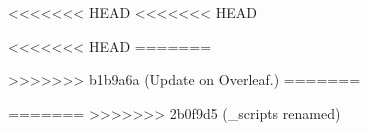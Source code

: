 

% 
% 
\setcounter{chapter}{1}
<<<<<<< HEAD
<<<<<<< HEAD

<<<<<<< HEAD
% 
% 
=======


>>>>>>> b1b9a6a (Update on Overleaf.)
=======

% 
% 
=======
% 
% 
% 
>>>>>>> 2b0f9d5 (_scripts renamed)
% 
% 

